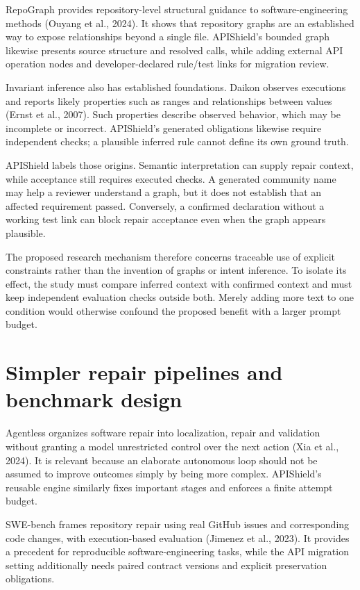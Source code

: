 \documentclass[12pt,a4paper,oneside]{report}
\begin{document}
RepoGraph provides repository-level structural guidance to software-engineering methods (Ouyang et al., 2024). It shows that repository graphs are an established way to expose relationships beyond a single file. APIShield's bounded graph likewise presents source structure and resolved calls, while adding external API operation nodes and developer-declared rule/test links for migration review.

Invariant inference also has established foundations. Daikon observes executions and reports likely properties such as ranges and relationships between values (Ernst et al., 2007). Such properties describe observed behavior, which may be incomplete or incorrect. APIShield's generated obligations likewise require independent checks; a plausible inferred rule cannot define its own ground truth.

APIShield labels those origins. Semantic interpretation can supply repair context, while acceptance still requires executed checks. A generated community name may help a reviewer understand a graph, but it does not establish that an affected requirement passed. Conversely, a confirmed declaration without a working test link can block repair acceptance even when the graph appears plausible.

The proposed research mechanism therefore concerns traceable use of explicit constraints rather than the invention of graphs or intent inference. To isolate its effect, the study must compare inferred context with confirmed context and must keep independent evaluation checks outside both. Merely adding more text to one condition would otherwise confound the proposed benefit with a larger prompt budget.

\section{Simpler repair pipelines and benchmark design}

Agentless organizes software repair into localization, repair and validation without granting a model unrestricted control over the next action (Xia et al., 2024). It is relevant because an elaborate autonomous loop should not be assumed to improve outcomes simply by being more complex. APIShield's reusable engine similarly fixes important stages and enforces a finite attempt budget.

SWE-bench frames repository repair using real GitHub issues and corresponding code changes, with execution-based evaluation (Jimenez et al., 2023). It provides a precedent for reproducible software-engineering tasks, while the API migration setting additionally needs paired contract versions and explicit preservation obligations.
\end{document}
